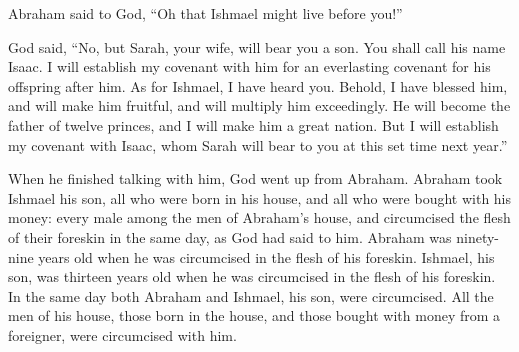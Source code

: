 {Abraham said to God, “Oh that Ishmael might live before you!”
\par }{\PP {}God said, “No, but Sarah, your wife, will bear you a son. You shall call his name Isaac. I will establish my covenant with him for an everlasting covenant for his offspring after him.
As for Ishmael, I have heard you. Behold, I have blessed him, and will make him fruitful, and will multiply him exceedingly. He will become the father of twelve princes, and I will make him a great nation.
But I will establish my covenant with Isaac, whom Sarah will bear to you at this set time next year.”
\par }{\PP {}When he finished talking with him, God went up from Abraham.
Abraham took Ishmael his son, all who were born in his house, and all who were bought with his money: every male among the men of Abraham’s house, and circumcised the flesh of their foreskin in the same day, as God had said to him.
Abraham was ninety-nine years old when he was circumcised in the flesh of his foreskin.
Ishmael, his son, was thirteen years old when he was circumcised in the flesh of his foreskin.
In the same day both Abraham and Ishmael, his son, were circumcised.
All the men of his house, those born in the house, and those bought with money from a foreigner, were circumcised with him.

}
